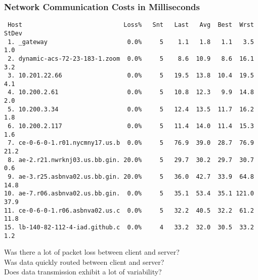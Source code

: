 \documentclass[14pt,aspectratio=169]{beamer}
\begin{document}
%
\begin{frame}[fragile]
  \frametitle{Network Communication Costs in Milliseconds}
  \normalsize
  \hspace*{-.1in}
  \begin{minipage}{6in}
    \vspace*{.15in}
    \begin{verbatim}
 Host                            Loss%   Snt   Last   Avg  Best  Wrst StDev
 1. _gateway                      0.0%     5    1.1   1.8   1.1   3.5   1.0
 2. dynamic-acs-72-23-183-1.zoom  0.0%     5    8.6  10.9   8.6  16.1   3.2
 3. 10.201.22.66                  0.0%     5   19.5  13.8  10.4  19.5   4.1
 4. 10.200.2.61                   0.0%     5   10.8  12.3   9.9  14.8   2.0
 5. 10.200.3.34                   0.0%     5   12.4  13.5  11.7  16.2   1.8
 6. 10.200.2.117                  0.0%     5   11.4  14.0  11.4  15.3   1.6
 7. ce-0-6-0-1.r01.nycmny17.us.b  0.0%     5   76.9  39.0  28.7  76.9  21.2
 8. ae-2.r21.nwrknj03.us.bb.gin. 20.0%     5   29.7  30.2  29.7  30.7   0.6
 9. ae-3.r25.asbnva02.us.bb.gin. 20.0%     5   36.0  42.7  33.9  64.8  14.8
10. ae-7.r06.asbnva02.us.bb.gin.  0.0%     5   35.1  53.4  35.1 121.0  37.9
11. ce-0-6-0-1.r06.asbnva02.us.c  0.0%     5   32.2  40.5  32.2  61.2  11.8
15. lb-140-82-112-4-iad.github.c  0.0%     4   33.2  32.0  30.5  33.2   1.2

    \end{verbatim}
  \end{minipage}
  \vspace*{0in}
  \begin{center}
    \normalsize \noindent Was there a lot of packet loss between client and
    server? \\
    \normalsize \noindent Was data quickly routed between client and server? \\
    \normalsize \noindent Does data transmission exhibit a lot of variability? \\
  \end{center}
\end{frame}
\end{document}
